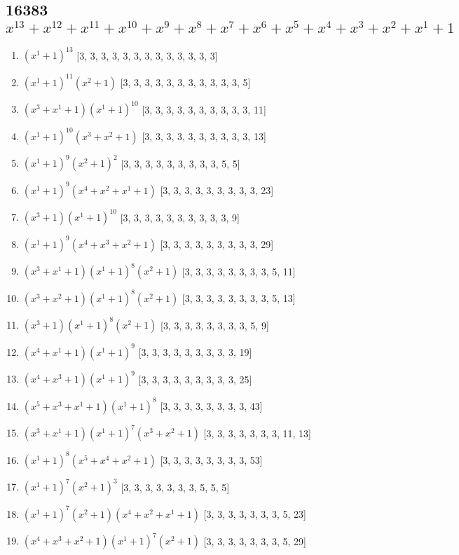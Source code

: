 \documentclass[10pt,twocolumn]{article}
\begin{document}
\subsection*{16383$x^{13} + x^{12} + x^{11} + x^{10} + x^{9} + x^{8} + x^{7} + x^{6} + x^{5} + x^{4} + x^{3} + x^{2} + x^{1} + 1$  } 
\begin{enumerate}
\item $(x^{1} + 1)^{13}$  [3, 3, 3, 3, 3, 3, 3, 3, 3, 3, 3, 3, 3]
\item $(x^{1} + 1)^{11}(x^{2} + 1)$  [3, 3, 3, 3, 3, 3, 3, 3, 3, 3, 3, 5]
\item $(x^{3} + x^{1} + 1)(x^{1} + 1)^{10}$  [3, 3, 3, 3, 3, 3, 3, 3, 3, 3, 11]
\item $(x^{1} + 1)^{10}(x^{3} + x^{2} + 1)$  [3, 3, 3, 3, 3, 3, 3, 3, 3, 3, 13]
\item $(x^{1} + 1)^{9}(x^{2} + 1)^{2}$  [3, 3, 3, 3, 3, 3, 3, 3, 3, 5, 5]
\item $(x^{1} + 1)^{9}(x^{4} + x^{2} + x^{1} + 1)$  [3, 3, 3, 3, 3, 3, 3, 3, 3, 23]
\item $(x^{3} + 1)(x^{1} + 1)^{10}$  [3, 3, 3, 3, 3, 3, 3, 3, 3, 3, 9]
\item $(x^{1} + 1)^{9}(x^{4} + x^{3} + x^{2} + 1)$  [3, 3, 3, 3, 3, 3, 3, 3, 3, 29]
\item $(x^{3} + x^{1} + 1)(x^{1} + 1)^{8}(x^{2} + 1)$  [3, 3, 3, 3, 3, 3, 3, 3, 5, 11]
\item $(x^{3} + x^{2} + 1)(x^{1} + 1)^{8}(x^{2} + 1)$  [3, 3, 3, 3, 3, 3, 3, 3, 5, 13]
\item $(x^{3} + 1)(x^{1} + 1)^{8}(x^{2} + 1)$  [3, 3, 3, 3, 3, 3, 3, 3, 5, 9]
\item $(x^{4} + x^{1} + 1)(x^{1} + 1)^{9}$  [3, 3, 3, 3, 3, 3, 3, 3, 3, 19]
\item $(x^{4} + x^{3} + 1)(x^{1} + 1)^{9}$  [3, 3, 3, 3, 3, 3, 3, 3, 3, 25]
\item $(x^{5} + x^{3} + x^{1} + 1)(x^{1} + 1)^{8}$  [3, 3, 3, 3, 3, 3, 3, 3, 43]
\item $(x^{3} + x^{1} + 1)(x^{1} + 1)^{7}(x^{3} + x^{2} + 1)$  [3, 3, 3, 3, 3, 3, 3, 11, 13]
\item $(x^{1} + 1)^{8}(x^{5} + x^{4} + x^{2} + 1)$  [3, 3, 3, 3, 3, 3, 3, 3, 53]
\item $(x^{1} + 1)^{7}(x^{2} + 1)^{3}$  [3, 3, 3, 3, 3, 3, 3, 5, 5, 5]
\item $(x^{1} + 1)^{7}(x^{2} + 1)(x^{4} + x^{2} + x^{1} + 1)$  [3, 3, 3, 3, 3, 3, 3, 5, 23]
\item $(x^{4} + x^{3} + x^{2} + 1)(x^{1} + 1)^{7}(x^{2} + 1)$  [3, 3, 3, 3, 3, 3, 3, 5, 29]

\end{enumerate}
\end{document}

